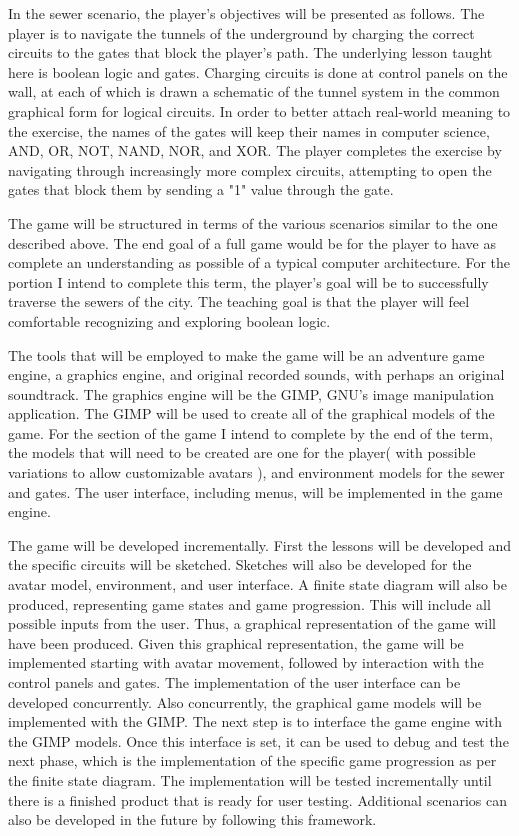 \documentclass[11pt]{article}	%
\begin{document}
In the sewer scenario, the player's objectives will be presented as follows.  The player is to navigate the tunnels of the underground by charging the correct circuits to the gates that block the player's path.  The underlying lesson taught here is boolean logic and gates.  Charging circuits is done at control panels on the wall, at each of which is drawn a schematic of the tunnel system in the common graphical form for logical circuits.  In order to better attach real-world meaning to the exercise, the names of the gates will keep their names in computer science, AND, OR, NOT, NAND, NOR, and XOR.  The player completes the exercise by navigating through increasingly more complex circuits, attempting to open the gates that block them by sending a "1" value through the gate.

The game will be structured in terms of the various scenarios similar to the one described above.  The end goal of a full game would be for the player to have as complete an understanding as possible of a typical computer architecture.  For the portion I intend to complete this term, the player's goal will be to successfully traverse the sewers of the city.  The teaching goal is that the player will feel comfortable recognizing and exploring boolean logic.

The tools that will be employed to make the game will be an adventure game engine, a graphics engine, and original recorded sounds, with perhaps an original soundtrack.  The graphics engine will be the GIMP, GNU's image manipulation application.  The GIMP will be used to create all of the graphical models of the game.  For the section of the game I intend to complete by the end of the term, the models that will need to be created are one for the player( with possible variations to allow customizable avatars ), and environment models for the sewer and gates.  The user interface, including menus, will be implemented in the game engine.

The game will be developed incrementally.  First the lessons will be developed and the specific circuits will be sketched.  Sketches will also be developed for the avatar model, environment, and user interface.  A finite state diagram will also be produced, representing game states and game progression.  This will include all possible inputs from the user.  Thus, a graphical representation of the game will have been produced.  Given this graphical representation, the game will be implemented starting with avatar movement, followed by interaction with the control panels and gates.  The implementation of the user interface can be developed concurrently.  Also concurrently, the graphical game models will be implemented with the GIMP.  The next step is to interface the game engine with the GIMP models.  Once this interface is set, it can be used to debug and test the next phase, which is the implementation of the specific game progression as per the finite state diagram.  The implementation will be tested incrementally until there is a finished product that is ready for user testing.  Additional scenarios can also be developed in the future by following this framework.
\end{document}
